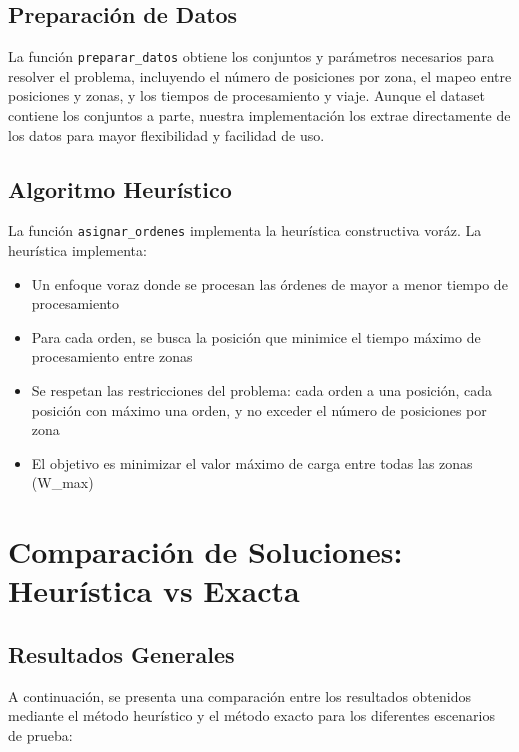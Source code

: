 \documentclass{hw-template}
\begin{document}
\subsection{Preparación de Datos}

La función \texttt{preparar\_datos} obtiene los conjuntos y parámetros necesarios para resolver el problema, incluyendo el número de posiciones por zona, el mapeo entre posiciones y zonas, y los tiempos de procesamiento y viaje. Aunque el dataset contiene los conjuntos a parte, nuestra implementación los extrae directamente de los datos para mayor flexibilidad y facilidad de uso.

\subsection{Algoritmo Heurístico}

La función \texttt{asignar\_ordenes} implementa la heurística constructiva voráz.
La heurística implementa:
\begin{itemize}
    \item Un enfoque voraz donde se procesan las órdenes de mayor a menor tiempo de procesamiento
    \item Para cada orden, se busca la posición que minimice el tiempo máximo de procesamiento entre zonas
    \item Se respetan las restricciones del problema: cada orden a una posición, cada posición con máximo una orden, y no exceder el número de posiciones por zona
    \item El objetivo es minimizar el valor máximo de carga entre todas las zonas (W\_max)
\end{itemize}


\section{Comparación de Soluciones: Heurística vs Exacta}

\subsection{Resultados Generales}

A continuación, se presenta una comparación entre los resultados obtenidos mediante el método heurístico y el método exacto para los diferentes escenarios de prueba:
\end{document}
